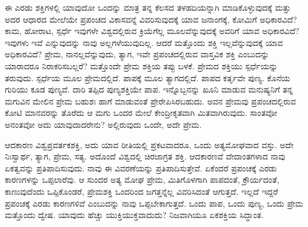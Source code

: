 \vskip 5pt

ಈ ಎರಡು ಶಕ್ತಿಗಳಲ್ಲಿ ಯಾವುದೋ ಒಂದನ್ನು ಮಾತ್ರ ತನ್ನ ಕೆಲಸದ ತಳಹದಿಯನ್ನಾಗಿ ಮಾಡಿಕೊಳ್ಳುವುದಕ್ಕೆ ಮತ್ತು ಅದರ ಆಧಾರದ ಮೇಲೆಯೇ ಪ್ರಪಂಚದ ವಿಕಾಸವನ್ನೆ ವಿವರಿಸುವುದಕ್ಕೆ ಯಾವ ಜನಾಂಗಕ್ಕೆ, ಕೋಮಿಗೆ ಅಧಿಕಾರವಿದೆ? ಕಾಮ, ಹೋರಾಟ, ಸ್ಪರ್ಧೆ ಇವುಗಳೇ ವಿಶ್ವದಲ್ಲಿರುವ ಕ್ರಿಯೆಗೆಲ್ಲ ಮೂಲವೆನ್ನುವುದಕ್ಕೆ ಅವರಿಗೆ ಯಾವ ಅಧಿಕಾರವಿದೆ? ಇವುಗಳು ಇವೆ ಎನ್ನುವುದನ್ನು ನಾವು ಅಲ್ಲಗಳೆಯುವುದಿಲ್ಲ. ಆದರೆ ಮತ್ತೊಂದು ಶಕ್ತಿ ಇಲ್ಲವೆನ್ನುವುದಕ್ಕೆ ಯಾವ ಅಧಿಕಾರವಿದೆ? ಪ್ರೇಮ, ನಾನಲ್ಲವೆನ್ನುವುದು, ತ್ಯಾಗ, ಇವೇ ಪ್ರಪಂಚದಲ್ಲಿರುವ ವಾಸ್ತವಿಕ ಶಕ್ತಿ ಎಂಬುದನ್ನು ಯಾರಾದರೂ ನಿರಾಕರಿಸಬಲ್ಲರೆ? ಮತ್ತೊಂದೇ ಪ್ರೇಮ ಶಕ್ತಿಯ ತಪ್ಪು ಬಳಕೆ. ಪ್ರೇಮದ ಶಕ್ತಿಯು ಸ್ಪರ್ಧೆಯನ್ನು ತರುವುದು. ಸ್ಪರ್ಧೆಯ ಮೂಲ ಪ್ರೇಮದಲ್ಲಿದೆ. ಪಾಪಕ್ಕೆ ಮೂಲ ತ್ಯಾಗದಲ್ಲಿದೆ. ಪಾಪದ ಕರ್ತೃವೇ ಪುಣ್ಯ. ಕೊನೆಯ ಗುರಿಯು ಕೂಡ ಪುಣ್ಯವೆ. ದಾರಿ ತಪ್ಪಿದ ಪುಣ್ಯಶಕ್ತಿಯೇ ಪಾಪ. ಇನ್ನೊಬ್ಬನನ್ನು ಖೂನಿ ಮಾಡುವ ಮನುಷ್ಯನಿಗೆ ತನ್ನ ಮಗುವಿನ ಮೇಲಿನ ಪ್ರೇಮ ಬಹುಶಃ ಹಾಗೆ ಮಾಡುವಂತೆ ಪ್ರೇರೇಪಿಸಿರಬಹುದು. ಅವನ ಪ್ರೇಮವು ಪ್ರಪಂಚದಲ್ಲಿರುವ ಕೋಟಿ ಮಾನವರನ್ನು ತೊರೆದು ಆ ಮಗು ಒಂದರ ಮೇಲೆ ಕೇಂದ್ರೀಕೃತವಾಗಿ ಮಿತವಾಗಿರುವುದು. ಸಾಂತವೋ ಅನಂತವೋ ಅದು ಯಾವುದಾದರೇನು? ಅಲ್ಲಿರುವುದು ಒಂದೇ, ಅದೇ ಪ್ರೇಮ. 

\vskip 5pt

ಆದಕಾರಣ ವಿಶ್ವಪ್ರವರ್ತಕಶಕ್ತಿ, ಅದು ಯಾವ ರೀತಿಯಲ್ಲಿ ಪ್ರಕಟವಾದರೂ, ಒಂದು ಅತ್ಯಮೋಘವಾದ ವಸ್ತು. ಅದೇ ನಿಃಸ್ವಾರ್ಥ, ತ್ಯಾಗ, ಪ್ರೇಮ, ಸತ್ಯ. ಅದೊಂದೆ ವಿಶ್ವದಲ್ಲಿ ಚಿರಜಾಗ್ರತ ಶಕ್ತಿ. ಆದಕಾರಣವೆ ವೇದಾಂತಗಳಾದ ನಾವು ಏಕತ್ವವನ್ನು ಪ್ರತಿಪಾದಿಸುವುದು. ನಾವು ಈ ವಿವರಣೆಯನ್ನು ಪ್ರತಿಪಾದಿಸುತ್ತೇವೆ. ಏಕೆಂದರೆ ಪ್ರಪಂಚಕ್ಕೆ ಎರಡು ಕಾರಣಗಳನ್ನು ಒಪ್ಪಲಾರೆವು. ಆ ಸುಂದರ ಅತ್ಯ ಮೋಘ ಪ್ರೇಮ, ಮಿತಿಗೊಳಗಾಗಿ ಪಾಪದಂತೆ, ಕ್ರೌರ್ಯದಂತೆ, ಕಾಣುವುದೆಂದು ಒಪ್ಪಿಕೊಂಡರೆ, ಪ್ರೇಮಶಕ್ತಿ ಒಂದರಿಂದ ಜಗತ್ತನ್ನೆಲ್ಲ ವಿವರಿಸಿದಂತೆ ಆಗುತ್ತದೆ. ಇಲ್ಲದೆ ಇದ್ದರೆ ಪ್ರಪಂಚಕ್ಕೆ ಎರಡು ಕಾರಣಗಳಿವೆ ಎಂಬುದನ್ನು ನಾವು ಒಪ್ಪಬೇಕಾಗುತ್ತದೆ. ಒಂದು ಪಾಪ, ಒಂದು ಪುಣ್ಯ, ಒಂದು ಪ್ರೇಮ ಮತ್ತೊಂದು ದ್ವೇಷ. ಯಾವುದು ಹೆಚ್ಚು ಯುಕ್ತಿಯುಕ್ತವಾದುದು? ನಿಜವಾಗಿಯೂ ಏಕಶಕ್ತಿಯ ಸಿದ್ಧಾಂತ. 

\vskip 5pt

